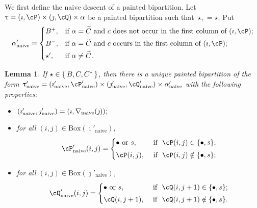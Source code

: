 \documentclass[12pt,a4paper]{amsart}
\def\tnaive{\mathrm{naive}}
\def\uptaupn{\uptau'_{\tnaive}}
\def\alphapn{\alpha'_{\tnaive}}
\def\imathpn{\imath'_{\tnaive}}
\def\jmathpn{\jmath'_{\tnaive}}
\def\DD{\nabla}
\numberwithin{equation}{section}
\newtheorem{lem}[thm]{Lemma}
\theoremstyle{remark}
\def\DD{\nabla}
\newcommand{\BOX}[1]{\mathrm{Box}(#1)}
\def\cPpn{\cP'_\mathrm{naive}}
\def\cQpn{\cQ'_\mathrm{naive}}
\begin{document}
We first define the naive descent of a painted bipartition. Let $\uptau=(\imath,\cP)\times (\jmath,\cQ)\times \alpha$ be a painted bipartition such that $\star_\tau=\star$. Put
  \begin{equation} \label{eq:def.alphap}
    \alphapn=\begin{cases} B^+,
  & \textrm{if $\alpha=\widetilde{C}$ and $c$ does not occur in the first column of $(\imath,\cP)$}; \smallskip \\
  B^-,
  & \textrm{if $\alpha=\widetilde{C}$ and  $c$ occurs in the first column of $(\imath,\cP)$}; \smallskip \\
  \star', & \textrm{if $\alpha\neq \widetilde C$}.
  \end{cases}
  \end{equation}

\begin{lem}\label{lemDDn1}
  If $\star \in \set{B,C,C^*}$, then there is a unique painted bipartition of the form $\uptaupn= (\imathpn,\cPpn)\times (\jmathpn,\cQpn)\times \alphapn$ with the following properties:
  \begin{itemize}
        \item $
   (\imathpn,\jmathpn)= (\imath,\DD_\mathrm{naive}(\jmath)); \smallskip
   $
   \item for all $(i,j)\in \BOX{\imathpn}$,
   \[
     \cPpn(i,j)=\begin{cases}
    \bullet \textrm{ or } s,&\textrm{ if  $\ \cP(i,j)\in \{\bullet, s\}$;} \smallskip \\
  \cP(i,j),& \textrm{ if $\ \cP(i,j)\notin \{\bullet, s\}$};\end{cases}
   \]
   \item for all $(i,j)\in \BOX{\jmathpn}$,
   \[
     \cQpn(i,j)=\begin{cases}
    \bullet \textrm{ or } s,&\textrm{ if  $\ \cQ(i,j+1)\in \{\bullet, s\}$;} \smallskip \\
  \cQ(i,j+1), & \textrm{ if $\ \cQ(i,j+1)\notin \{\bullet, s\}$}.  \end{cases}
   \]
    \end{itemize}
    \end{lem}
\end{document}
